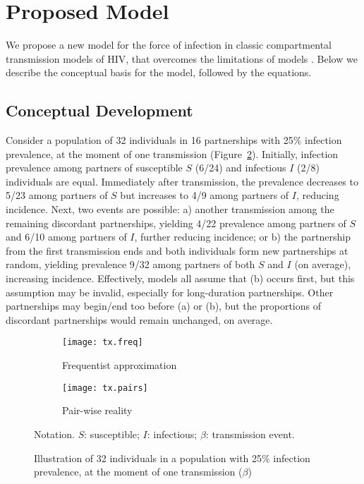 \section{Proposed Model}\label{prop}
We propose a new model for the force of infection in
classic compartmental transmission models of HIV,
that overcomes the limitations of models .
Below we describe the conceptual basis for the model, followed by the equations.
\subsection{Conceptual Development}\label{prop.cd}
Consider a population of 32 individuals in 16 partnerships with 25\% infection prevalence,
at the moment of one transmission (Figure~\ref{fig:tx.pairs}).
Initially, infection prevalence among partners
of susceptible $S$ (6/24) and infectious $I$ (2/8) individuals are equal.
Immediately after transmission, the prevalence
decreases to 5/23 among partners of $S$ but increases to 4/9 among partners of $I$, reducing incidence.
Next, two events are possible:
a) another transmission among the remaining discordant partnerships,
yielding 4/22 prevalence among partners of $S$ and 6/10 among partners of $I$,
further reducing incidence; or
b) the partnership from the first transmission ends
and both individuals form new partnerships at random,
yielding prevalence 9/32 among partners of both $S$ and $I$ (on average), increasing incidence.
Effectively, models  all assume that (b) occurs first,
but this assumption may be invalid, especially for long-duration partnerships.
Other partnerships may begin/end too before (a) or (b),
but the proportions of discordant partnerships would remain unchanged, on average.
\begin{figure}[h]
  \begin{subfigure}{\textwidth}
    \centerline{\texttt{[image: tx.freq]}}
    \caption{Frequentist approximation}
    \label{fig:tx.freq}
  \end{subfigure}
  \begin{subfigure}{\textwidth}
    \centerline{\texttt{[image: tx.pairs]}}
    \caption{Pair-wise reality}
    \label{fig:tx.pairs}
  \end{subfigure}
  \caption{Illustration of 32 individuals in a population with 25\% infection prevalence,
    at the moment of one transmission ($\beta$)}
  \label{fig:tx}
  \floatfoot
  Notation. $S$: susceptible; $I$: infectious; $\beta$: transmission event.
\end{figure}
